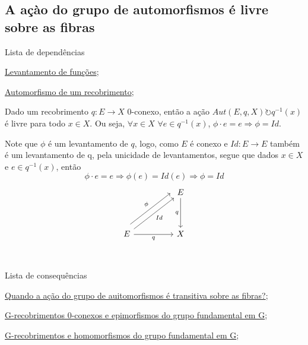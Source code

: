 \subsection{A açào do grupo de automorfismos é livre sobre as fibras}
\label{acao-de-automorfismos-e-livre-prop}
\begin{titlemize}{Lista de dependências}
	\item \hyperref[levantamento-de-funções-prop]{Levantamento de funções};\\
	\item \hyperref[automorfismo-de-recobrimento-def]{Automorfismo de um recobrimento};
\end{titlemize}
\begin{prop}
	Dado um recobrimento $q:E \longrightarrow X$ $0$-conexo, então a ação $Aut(E, q, X) \circlearrowright q^{-1}(x)$ é livre para todo $x \in X$. Ou seja, $\forall x \in X$ $\forall e \in q^{-1}(x)$, $\phi \cdot e = e \Longrightarrow \phi = Id$.\\
\end{prop}

\begin{dem}
    Note que $\phi$ é um levantamento de $q$, logo, como $E$ é conexo e $Id:E \longrightarrow E$ também é um levantamento de q, pela unicidade de levantamentos, segue que dados $x \in X$ e $e \in q^{-1}(x)$, então $$\phi \cdot e = e \Longrightarrow \phi(e) = Id(e) \Longrightarrow \phi = Id$$
    \[\begin{tikzcd}
    	&& E \\
    	\\
    	E && X \\
    	\arrow["q"', from=1-3, to=3-3]
    	\arrow["Id"', from=3-1, to=1-3]
    	\arrow["\phi", shift left=3, from=3-1, to=1-3]
    	\arrow["q"', from=3-1, to=3-3]
    \end{tikzcd}\]
\end{dem}

\begin{titlemize}{Lista de consequências}
	\item \hyperref[acao-de-automorfismo-transitiva-prop]{Quando a ação do grupo de auitomorfismos é transitiva sobre as fibras?};\\
   	\item \hyperref[g-recobrimentos-e-epimorfismos-prop]{G-recobrimentos 0-conexos e epimorfismos do grupo fundamental em G};\\
    	\item \hyperref[homomorfismos-e-g-recobrimentos-prop]{G-recobrimentos e homomorfismos do grupo fundamental em G};
\end{titlemize}
